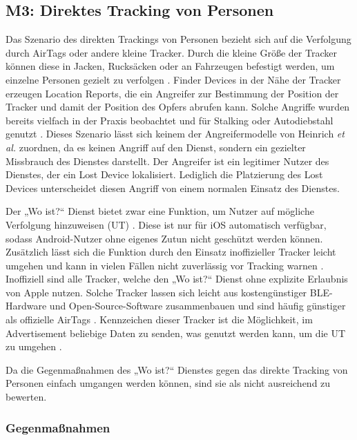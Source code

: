 \subsection[M3]{M3: Direktes Tracking von Personen}
\label{missbrauch:3}
Das Szenario des direkten Trackings von Personen bezieht sich auf die Verfolgung durch AirTags oder andere kleine Tracker.
Durch die kleine Größe der Tracker können diese in Jacken, Rucksäcken oder an Fahrzeugen befestigt werden, um einzelne Personen gezielt zu verfolgen \cite{Roth_airtags}.
Finder Devices in der Nähe der Tracker erzeugen Location Reports, die ein Angreifer zur Bestimmung der Position der Tracker und damit der Position des Opfers abrufen kann.
Solche Angriffe wurden bereits vielfach in der Praxis beobachtet und für Stalking oder Autodiebstahl genutzt \cite{NYT_Airtags}.
Dieses Szenario lässt sich keinem der Angreifermodelle von Heinrich \textit{et al.} \cite{Heinrich_FindMy} zuordnen, da es keinen Angriff auf den Dienst, sondern ein gezielter Missbrauch des Dienstes darstellt.
Der Angreifer ist ein legitimer Nutzer des Dienstes, der ein Lost Device lokalisiert.
Lediglich die Platzierung des Lost Devices unterscheidet diesen Angriff von einem normalen Einsatz des Dienstes.

Der „Wo ist?“ Dienst bietet zwar eine Funktion, um Nutzer auf mögliche Verfolgung hinzuweisen (\ac{UT}) \cite{Apple_FindMySpec}.
Diese ist nur für iOS automatisch verfügbar, sodass Android-Nutzer ohne eigenes Zutun nicht geschützt werden können.
Zusätzlich lässt sich die Funktion durch den Einsatz inoffizieller Tracker leicht umgehen und kann in vielen Fällen nicht zuverlässig vor Tracking warnen \cite{Heinrich_AirGuard,Mayberry_Tracking}.
Inoffiziell sind alle Tracker, welche den „Wo ist?“ Dienst ohne explizite Erlaubnis von Apple nutzen.
Solche Tracker lassen sich leicht aus kostengünstiger \ac{BLE}-Hardware und Open-Source-Software zusammenbauen und sind häufig günstiger als offizielle AirTags \cite{Heinrich_OpenHaystack,Mayberry_Tracking}.
Kennzeichen dieser Tracker ist die Möglichkeit, im Advertisement beliebige Daten zu senden, was genutzt werden kann, um die \ac{UT} zu umgehen \cite{Mayberry_Tracking}.

Da die Gegenmaßnahmen des „Wo ist?“ Dienstes gegen das direkte Tracking von Personen einfach umgangen werden können, sind sie als nicht ausreichend zu bewerten.

\subsubsection{Gegenmaßnahmen}

